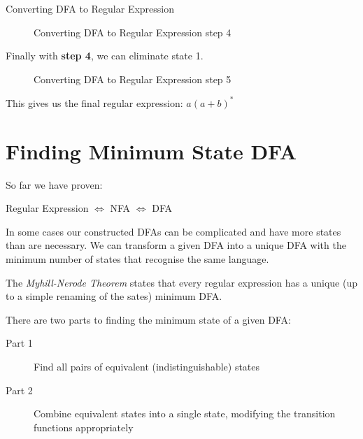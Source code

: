 \begin{example}{Converting DFA to Regular Expression}
\begin{figure}[H]
    \caption{Converting DFA to Regular Expression step 4}
    \label{fig:fa-to-regex-eg-step4}
\end{figure}

Finally with \textbf{step 4}, we can eliminate state 1.
\begin{figure}[H]
    \centering
    \caption{Converting DFA to Regular Expression step 5}
    \label{fig:fa-to-regex-eg-step5}
\end{figure}

This gives us the final regular expression: $a(a+b)^*$

\end{example}

\section{Finding Minimum State DFA}
So far we have proven:
\begin{center}
    Regular Expression $\Leftrightarrow$ NFA $\Leftrightarrow$ DFA
\end{center}

In some cases our constructed DFAs can be complicated and have more states than are necessary. We can transform a given DFA into a unique DFA with the minimum number of states that recognise the same language. 

The \textit{Myhill-Nerode Theorem} states that every regular expression has a unique (up to a simple renaming of the sates) minimum DFA.

There are two parts to finding the minimum state of a given DFA:
\begin{description}
    \item[Part 1] Find all pairs of equivalent (indistinguishable) states
    \item[Part 2] Combine equivalent states into a single state, modifying the transition functions appropriately
\end{description}


